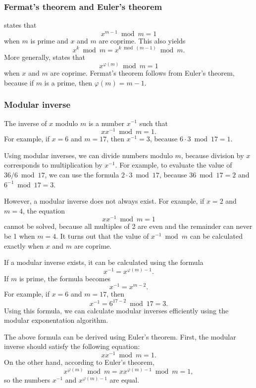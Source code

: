 \subsubsection{Fermat's theorem and Euler's theorem}


states that
\[x^{m-1} \bmod m = 1\]
when $m$ is prime and $x$ and $m$ are coprime.
This also yields
\[x^k \bmod m = x^{k \bmod (m-1)} \bmod m.\]
More generally, 
states that
\[x^{\varphi(m)} \bmod m = 1\]
when $x$ and $m$ are coprime.
Fermat's theorem follows from Euler's theorem,
because if $m$ is a prime, then $\varphi(m)=m-1$.

\subsubsection{Modular inverse}


The inverse of $x$ modulo $m$
is a number $x^{-1}$ such that
\[ x x^{-1} \bmod m = 1. \]
For example, if $x=6$ and $m=17$,
then $x^{-1}=3$, because $6\cdot3 \bmod 17=1$.

Using modular inverses, we can divide numbers
modulo $m$, because division by $x$
corresponds to multiplication by $x^{-1}$.
For example, to evaluate the value of $36/6 \bmod 17$,
we can use the formula $2 \cdot 3 \bmod 17$,
because $36 \bmod 17 = 2$ and $6^{-1} \bmod 17 = 3$.

However, a modular inverse does not always exist.
For example, if $x=2$ and $m=4$, the equation
\[ x x^{-1} \bmod m = 1 \]
cannot be solved, because all multiples of 2
are even and the remainder can never be 1 when $m=4$.
It turns out that the value of $x^{-1} \bmod m$
can be calculated exactly when $x$ and $m$ are coprime.

If a modular inverse exists, it can be
calculated using the formula
\[
x^{-1} = x^{\varphi(m)-1}.
\]
If $m$ is prime, the formula becomes
\[
x^{-1} = x^{m-2}.
\]
For example, if $x=6$ and $m=17$, then
\[x^{-1}=6^{17-2} \bmod 17 = 3.\]
Using this formula, we can calculate modular inverses
efficiently using the modular exponentation algorithm.

The above formula can be derived using Euler's theorem.
First, the modular inverse should satisfy the following equation:
\[
x x^{-1} \bmod m = 1.
\]
On the other hand, according to Euler's theorem,
\[
x^{\varphi(m)} \bmod m =  xx^{\varphi(m)-1} \bmod m = 1,
\]
so the numbers $x^{-1}$ and $x^{\varphi(m)-1}$ are equal.

